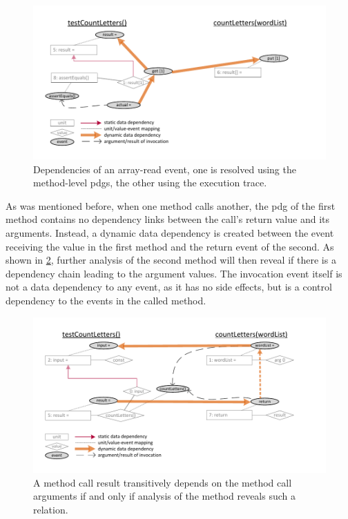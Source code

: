 \begin{figure}[tp]
\centering
\includegraphics[width=.8\linewidth, clip, trim=6mm 7mm 19mm 7mm]{img/graph_dynamic_array}
\caption{Dependencies of an array-read event, one is resolved using the method-level \aclp{pdg}, the other using the execution trace.}
\label{fig:graph_dynamic_array}
\end{figure}

As was mentioned before, when one method calls another, the \ac{pdg} of the first method contains no dependency links between the call's return value and its arguments.
Instead, a dynamic data dependency is created between the event receiving the value in the first method and the return event of the second.
As shown in \cref{fig:graph_dynamic_method}, further analysis of the second method will then reveal if there is a dependency chain leading to the argument values.
The invocation event itself is not a data dependency to any event, as it has no side effects, but is a control dependency to the events in the called method.

\begin{figure}[tp]
\centering
\includegraphics[width=.8\linewidth, clip, trim=6mm 7mm 16mm 7mm]{img/graph_dynamic_method}
\caption{A method call result transitively depends on the method call arguments if and only if analysis of the method reveals such a relation.}
\label{fig:graph_dynamic_method}
\end{figure}

